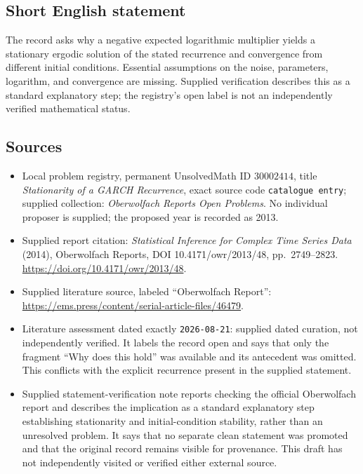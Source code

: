 \documentclass[11pt]{article}
\begin{document}
\subsection{Short English statement}
The record asks why a negative expected logarithmic multiplier yields a stationary ergodic solution of the stated recurrence and convergence from different initial conditions. Essential assumptions on the noise, parameters, logarithm, and convergence are missing. Supplied verification describes this as a standard explanatory step; the registry's open label is not an independently verified mathematical status.
\subsection{Sources}
\begin{itemize}
\item Local problem registry, permanent UnsolvedMath ID \(30002414\), title \emph{Stationarity of a GARCH Recurrence}, exact source code \texttt{catalogue entry}; supplied collection: \emph{Oberwolfach Reports Open Problems}. No individual proposer is supplied; the proposed year is recorded as 2013.
\item Supplied report citation: \emph{Statistical Inference for Complex Time Series Data} (2014), Oberwolfach Reports, DOI 10.4171/owr/2013/48, pp.\ 2749--2823. \url{https://doi.org/10.4171/owr/2013/48}.
\item Supplied literature source, labeled ``Oberwolfach Report'': \url{https://ems.press/content/serial-article-files/46479}.
\item Literature assessment dated exactly \texttt{2026-08-21}: supplied dated curation, not independently verified. It labels the record open and says that only the fragment ``Why does this hold'' was available and its antecedent was omitted. This conflicts with the explicit recurrence present in the supplied statement.
\item Supplied statement-verification note reports checking the official Oberwolfach report and describes the implication as a standard explanatory step establishing stationarity and initial-condition stability, rather than an unresolved problem. It says that no separate clean statement was promoted and that the original record remains visible for provenance. This draft has not independently visited or verified either external source.
\end{itemize}
\end{document}
